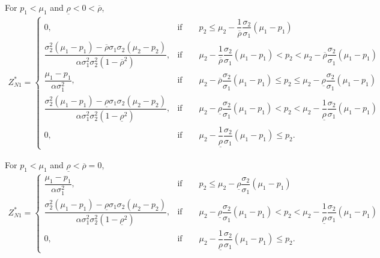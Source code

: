 \documentclass[10pt]{article}
\begin{document}
For $ p_1 < \mu_1 $ and $ \underline{\rho} < 0 < \overline{\rho} $,
{\footnotesize \begin{eqnarray}
Z_{N 1}^* = \left\{ \begin{matrix}
0, & \text{if} \qquad p_2 \leqslant \mu_2 - \dfrac1{\overline{\rho}} \dfrac{\sigma_2}{\sigma_1} (\mu_1 - p_1) \\
\dfrac{\sigma_2^2 (\mu_1 - p_1) - \overline{\rho} \sigma_1 \sigma_2 (\mu_2 - p_2)}{\alpha \sigma_1^2 \sigma_2^2 (1 - \overline{\rho}^2)}, & \text{if} \qquad \mu_2 - \dfrac1{\overline{\rho}} \dfrac{\sigma_2}{\sigma_1} (\mu_1 - p_1) < p_2 < \mu_2 - \overline{\rho} \dfrac{\sigma_2}{\sigma_1} (\mu_1 - p_1) \\
\dfrac{\mu_1 - p_1}{\alpha \sigma_1^2}, & \text{if} \qquad \mu_2 - \overline{\rho} \dfrac{\sigma_2}{\sigma_1} (\mu_1 - p_1) \leqslant p_2 \leqslant \mu_2 - \underline{\rho} \dfrac{\sigma_2}{\sigma_1} (\mu_1 - p_1) \\
\dfrac{\sigma_2^2 (\mu_1 - p_1) - \underline{\rho} \sigma_1 \sigma_2 (\mu_2 - p_2)}{\alpha \sigma_1^2 \sigma_2^2 (1 - \underline{\rho}^2)}, & \text{if} \qquad \mu_2 - \underline{\rho} \dfrac{\sigma_2}{\sigma_1} (\mu_1 - p_1) < p_2 < \mu_2 - \dfrac1{\underline{\rho}} \dfrac{\sigma_2}{\sigma_1} (\mu_1 - p_1) \\
0, & \text{if} \qquad \mu_2 - \dfrac1{\underline{\rho}} \dfrac{\sigma_2}{\sigma_1} (\mu_1 - p_1) \leqslant p_2.
\end{matrix} \right.
\end{eqnarray}}

For $ p_1 < \mu_1 $ and $ \underline{\rho} < \overline{\rho} = 0 $,
{\footnotesize \begin{eqnarray}
Z_{N 1}^* = \left\{ \begin{matrix}
\dfrac{\mu_1 - p_1}{\alpha \sigma_1^2}, & \text{if} \qquad p_2 \leqslant \mu_2 - \underline{\rho} \dfrac{\sigma_2}{\sigma_1} (\mu_1 - p_1) \\
\dfrac{\sigma_2^2 (\mu_1 - p_1) - \underline{\rho} \sigma_1 \sigma_2 (\mu_2 - p_2)}{\alpha \sigma_1^2 \sigma_2^2 (1 - \underline{\rho}^2)}, & \text{if} \qquad \mu_2 - \underline{\rho} \dfrac{\sigma_2}{\sigma_1} (\mu_1 - p_1) < p_2 < \mu_2 - \dfrac1{\underline{\rho}} \dfrac{\sigma_2}{\sigma_1} (\mu_1 - p_1) \\
0, & \text{if} \qquad \mu_2 - \dfrac1{\underline{\rho}} \dfrac{\sigma_2}{\sigma_1} (\mu_1 - p_1) \leqslant p_2.
\end{matrix} \right.
\end{eqnarray}}
\end{document}
